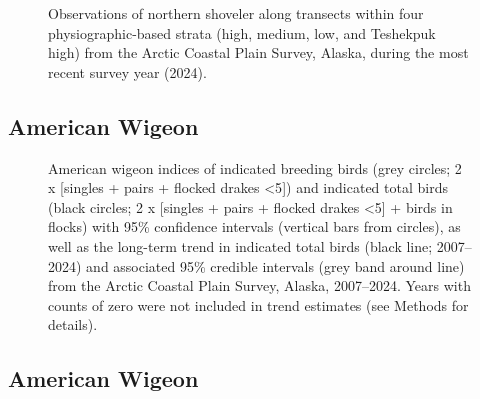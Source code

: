\documentclass[
]{article}
\begin{document}
\begin{figure}


\caption{\label{fig-NSHOmap}Observations of northern shoveler along
transects within four physiographic-based strata (high, medium, low, and
Teshekpuk high) from the Arctic Coastal Plain Survey, Alaska, during the
most recent survey year (2024).}

\end{figure}%

\newpage{}

\subsection*{American Wigeon}\label{american-wigeon}

\begin{figure}


\caption{\label{fig-AMWI}American wigeon indices of indicated breeding
birds (grey circles; 2 x {[}singles + pairs + flocked drakes
\textless5{]}) and indicated total birds (black circles; 2 x {[}singles
+ pairs + flocked drakes \textless5{]} + birds in flocks) with 95\%
confidence intervals (vertical bars from circles), as well as the
long-term trend in indicated total birds (black line; 2007--2024) and
associated 95\% credible intervals (grey band around line) from the
Arctic Coastal Plain Survey, Alaska, 2007--2024. Years with counts of
zero were not included in trend estimates (see Methods for details).}

\end{figure}%

\newpage{}

\subsection*{American Wigeon}\label{american-wigeon-1}

\begingroup\fontsize{10}{12}\selectfont
\end{document}

